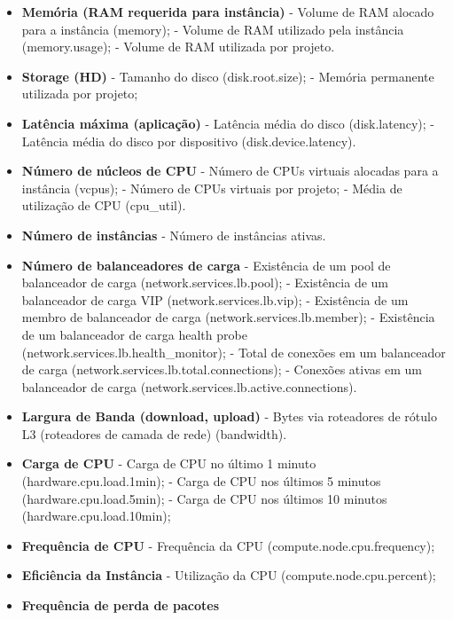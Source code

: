 \documentclass[conference]{IEEEtran}
\begin{document}
\begin{itemize}
 \item \textbf{Memória (RAM requerida para instância)}
    \subitem - Volume de RAM alocado para a instância (memory);
    \subitem - Volume de RAM utilizado pela instância (memory.usage);
    \subitem - Volume de RAM utilizada por projeto.
 \item \textbf{Storage (HD)}
    \subitem - Tamanho do disco  (disk.root.size);
    \subitem - Memória permanente utilizada por projeto;
 \item \textbf{Latência máxima  (aplicação)}
    \subitem - Latência média do disco (disk.latency);
    \subitem - Latência média do disco por dispositivo (disk.device.latency).
 \item \textbf{Número de núcleos de CPU}
    \subitem - Número de CPUs virtuais alocadas para a instância (vcpus);
    \subitem - Número de CPUs virtuais por projeto;
    \subitem - Média de utilização de CPU (cpu\_util).
 \item \textbf{Número de instâncias}
    \subitem - Número de instâncias ativas.
 \item \textbf{Número de balanceadores de carga}
    \subitem - Existência de um pool de balanceador de carga (network.services.lb.pool);
    \subitem - Existência de um balanceador de carga VIP (network.services.lb.vip);
    \subitem - Existência de um membro de balanceador de carga (network.services.lb.member);
    \subitem - Existência de um balanceador de carga health probe (network.services.lb.health\_monitor);
    \subitem - Total de conexões em um balanceador de carga (network.services.lb.total.connections);
    \subitem - Conexões ativas em um balanceador de carga (network.services.lb.active.connections).
  \item \textbf{Largura de Banda (download, upload)}
    \subitem - Bytes via roteadores de rótulo L3 (roteadores de camada de rede) (bandwidth).
  \item \textbf{Carga de CPU}   
    \subitem - Carga de CPU no último 1 minuto (hardware.cpu.load.1min);
    \subitem - Carga de CPU nos últimos 5 minutos (hardware.cpu.load.5min);
    \subitem - Carga de CPU nos últimos 10 minutos (hardware.cpu.load.10min);
  \item \textbf{Frequência de CPU}  
    \subitem - Frequência da CPU (compute.node.cpu.frequency);
  \item \textbf{Eficiência da Instância}    
    \subitem - Utilização da CPU (compute.node.cpu.percent);
  \item \textbf{Frequência de perda de pacotes}   

\end{itemize}
\end{document}
